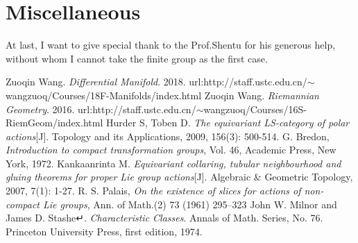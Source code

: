\documentclass[reqno,11pt]{amsart}
\numberwithin{equation}{section}
\theoremstyle{plain}
\theoremstyle{plain}
\numberwithin{equation}{section}
\theoremstyle{remark}
\begin{document}
\section{Miscellaneous} 
At last, I want to give special thank to the Prof.Shentu for his generous help, without whom I cannot take the finite group as the first case.

 
   



 








\begin{thebibliography}{99}

 
Zuoqin Wang. \emph{Differential Manifold}. 2018. url:http://staff.ustc.edu.cn/$\sim$wangzuoq/Courses/18F-Manifolds/index.html
Zuoqin Wang. \emph{Riemannian Geometry}. 2016. url:http://staff.ustc.edu.cn/$\sim$wangzuoq/Courses/16S-RiemGeom/index.html
Hurder S, Toben D. \emph{The equivariant LS-category of polar actions}[J]. Topology and its Applications, 2009, 156(3): 500-514.
G. Bredon, \emph{Introduction to compact transformation groups}, Vol. 46, Academic Press, New York, 1972.
Kankaanrinta M. \emph{Equivariant collaring, tubular neighbourhood and gluing theorems for proper Lie group actions}[J]. Algebraic \& Geometric Topology, 2007, 7(1): 1-27.
R. S. Palais, \emph{On the existence of slices for actions of non-compact Lie groups}, Ann. of
Math.(2) 73 (1961) 295--323
John W. Milnor and James D. Stashe↵. \emph{Characteristic
Classes}. Annals of Math. Series, No. 76.
Princeton University Press, first edition, 1974.
  

\end{thebibliography}
\end{document}
